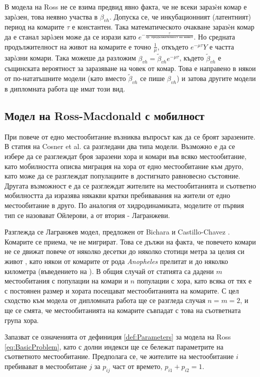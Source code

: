 В модела на Ross не се взима предвид явно факта, че не всеки заразèн комар е зарàзен, това неявно участва в $\beta_{vh}$.
Допуска се, че инкубационният (латентният) период на комарите $\tau$ е константен.
Така математическото очакване заразèн комар да е станал зарàзен може да се изрази като $e^{-\frac{\tau}{\text{ср. продължителност на живот}}}$.
Но средната продължителност на живот на комарите е точно $\frac{1}{\mu}$, откъдето $e^{-\mu\tau}Y$ е частта зарàзни комари.
Така можеше да разложим $\beta_{vh} = \tilde{\beta}_{vh} e^{-\mu\tau}$, където $\tilde{\beta}_{vh}$ е същинската вероятност за заразяване на човек от комар.
Това е направено в някои от по-нататъшните модели \cite{Smith2012} (като вместо $\tilde{\beta}_{vh}$ се пише $\beta_{vh}$) и затова другите модели в дипломната работа ще имат този вид.

\subsection{Модел на Ross-Macdonald с мобилност}
При повече от едно местообитание възниква въпросът как да се броят заразените. В статия на Cosner et al. \cite{Cosner2009} са разгледани два типа модели.
Възможно е да се избере да се разглеждат броя заразени хора и комари във всяко местообитание, като мобилността описва миграция на хора от едно местообитание към друго, като може да се разглеждат популациите в достигнато равновесно състояние.
Другата възможност е да се разглеждат жителите на местообитанията и съответно мобилността да изразява някакви кратки пребивавания на жители от едно местообитание в друго.
По аналогия от хидродинамиката, моделите от първия тип се назовават Ойлерови, а от втория - Лагранжеви.

Разглежда се Лагранжев модел, предложен от Bichara и Castillo-Chavez \cite{Bichara2016}.
Комарите се приема, че не мигрират.
Това се дължи на факта, че повечето комари не се движат повече от няколко десетки до няколко стотици метра за целия си живот \cite{Elbers2015}, като някои от комарите от рода \textit{Anopheles} прелитат и до няколко километра (въведението на \cite{Bichara2016}).
В общия случай от статията са дадени $m$ местообитания с популации на комари и $n$ популации с хора, като всяка от тях е с постоянен размер и хората посещават местообитанията на комарите.
С цел сходство към модела от дипломната работа ще се разгледа случая $n=m=2$, и ще се смята, че местообитанията на комарите съвпадат с това на съответната група хора.

Запазват се означенията от дефиниция \ref{def:Parameters} за модела на Ross \eqref{eq:BasicProblem}, като с долни индекси ще се бележат параметрите на съответното местообитание.
Предполага се, че жителите на местообитание $i$ пребивават в местообитане $j$ за $p_{ij}$ част от времето, $p_{i1} + p_{i2} = 1$.

